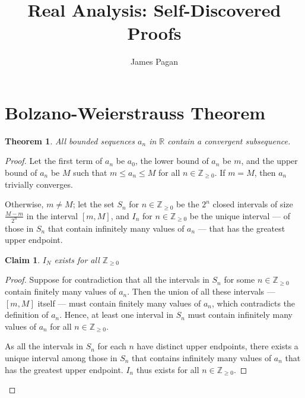 \documentclass[11pt]{article}
\title{Real Analysis: Self-Discovered Proofs}
\author{James Pagan}
\date{}
\newtheorem*{theorem*}{Theorem}
\newtheorem*{claim*}{Claim}
\begin{document}
\maketitle
\tableofcontents


\section{Bolzano-Weierstrauss Theorem}

\begin{theorem*}
	All bounded sequences $a_n$ in $\mathbb{R}$ contain a convergent subsequence.
\end{theorem*}

\begin{proof}

Let the first term of $a_n$ be $a_{0}$, the lower bound of $a_{n}$ be $m$, and the upper bound of $a_{n}$ be $M$ such that $m \le a_n \le M$ for all $n \in \mathbb{Z}_{\ge 0}$. If $m = M$, then $a_n$ trivially converges.

Otherwise, $m \ne M$; let the set $S_n$ for $n \in \mathbb{Z}_{\ge 0}$ be the $2^{n}$ closed intervals of size $\tfrac{M-m}{2^{n}}$ in the interval $[m, M]$, and $I_n$ for $n \in \mathbb{Z}_{\ge 0}$ be the unique interval --- of those in $S_n$ that contain infinitely many values of $a_n$ --- that has the greatest upper endpoint. 

\begin{adjustwidth}{1cm}{}
	\begin{claim*}
		$I_N$ exists for all $\mathbb{Z}_{\ge 0}$
	\end{claim*}
	\begin{proof}\renewcommand{\qedsymbol}{}
		Suppose for contradiction that all the intervals in $S_{n}$ for some $n \in \mathbb{Z}_{\ge 0}$ contain finitely many values of $a_n$. Then the union of all these intervals --- $[m, M]$ itself --- must contain finitely many values of $a_n$, which contradicts the definition of $a_n$. Hence, at least one interval in $S_{n}$ must contain infinitely many values of $a_n$ for all $n \in \mathbb{Z}_{\ge 0}$.

		As all the intervals in $S_{n}$ for each $n$ have distinct upper endpoints, there exists a unique interval among those in $S_{n}$ that contains infinitely many values of $a_n$ that has the greatest upper endpoint. $I_n$ thus exists for all $n \in \mathbb{Z}_{\ge 0}$.
	\end{proof}
\end{adjustwidth}


\end{proof}
\end{document}
